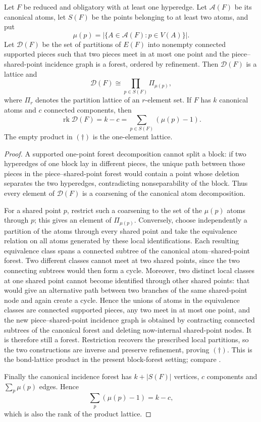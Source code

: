 \begin{lemma}
\label{lemma-local-decomposition-lattice-product}
Let $F$ be reduced and obligatory with at least one hyperedge.  Let
$\mathcal A(F)$ be its canonical atoms, let $S(F)$ be the points belonging to
at least two atoms, and put
\[
 \mu(p)=|\{A\in\mathcal A(F):p\in V(A)\}|.
\]
Let $\mathcal D(F)$ be the set of partitions of $E(F)$ into nonempty connected
supported pieces such that two pieces meet in at most one point and the
piece--shared-point incidence graph is a forest, ordered by refinement.  Then
$\mathcal D(F)$ is a lattice and
\[
 \mathcal D(F)\cong\prod_{p\in S(F)}\Pi_{\mu(p)},
 \tag{\dagger}
\]
where $\Pi_r$ denotes the partition lattice of an $r$-element set.  If $F$
has $k$ canonical atoms and $c$ connected components, then
\[
 \operatorname{rk}\mathcal D(F)=k-c
   =\sum_{p\in S(F)}(\mu(p)-1).
 \tag{\ddagger}
\]
The empty product in \((\dagger)\) is the one-element lattice.
\end{lemma}
\begin{proof}
A supported one-point forest decomposition cannot split a block: if two
hyperedges of one block lay in different pieces, the unique path between
those pieces in the piece--shared-point forest would contain a point whose
deletion separates the two hyperedges, contradicting nonseparability of the
block.  Thus every element of $\mathcal D(F)$ is a coarsening of the canonical
atom decomposition.

For a shared point $p$, restrict such a coarsening to the set of the
$\mu(p)$ atoms through $p$; this gives an element of $\Pi_{\mu(p)}$.
Conversely, choose independently a partition of the atoms through every
shared point and take the equivalence relation on all atoms generated by
these local identifications.  Each resulting equivalence class spans a
connected subtree of the canonical atom--shared-point forest.  Two different
classes cannot meet at two shared points, since the two connecting subtrees
would then form a cycle.  Moreover, two distinct local classes at one shared
point cannot become identified through other shared points: that would give
an alternative path between two branches of the same shared-point node and
again create a cycle.  Hence the unions of atoms in the equivalence classes
are connected supported pieces, any two meet in at most one point, and the
new piece--shared-point incidence graph is obtained by contracting connected
subtrees of the canonical forest and deleting now-internal shared-point
nodes.  It is therefore still a forest.  Restriction recovers the prescribed
local partitions, so the two constructions are inverse and preserve
refinement, proving \((\dagger)\).  This is the bond-lattice product in the
present block-forest setting; compare \citet{simon2011}.

Finally the canonical incidence forest has $k+|S(F)|$ vertices, $c$
components and $\sum_p\mu(p)$ edges.  Hence
\[
 \sum_p(\mu(p)-1)=k-c,
\]
which is also the rank of the product lattice.
\end{proof}

